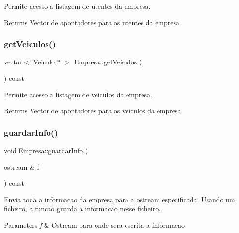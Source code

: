 Permite acesso a listagem de utentes da empresa. 

\begin{DoxyReturn}{Returns}
Vector de apontadores para os utentes da empresa 
\end{DoxyReturn}
\mbox{\label{class_empresa_a64b4f5f7e313a07569451b5a82f822bb}} 
\subsubsection{\texorpdfstring{get\+Veiculos()}{getVeiculos()}}
{\footnotesize\ttfamily vector$<$ \mbox{\hyperlink{class_veiculo}{Veiculo}} $\ast$ $>$ Empresa\+::get\+Veiculos (\begin{DoxyParamCaption}{ }\end{DoxyParamCaption}) const}



Permite acesso a listagem de veiculos da empresa. 

\begin{DoxyReturn}{Returns}
Vector de apontadores para os veiculos da empresa 
\end{DoxyReturn}
\mbox{\label{class_empresa_a4bfb65fa408e944aed798e7c37933b78}} 
\subsubsection{\texorpdfstring{guardar\+Info()}{guardarInfo()}}
{\footnotesize\ttfamily void Empresa\+::guardar\+Info (\begin{DoxyParamCaption}\item[{ostream \&}]{f }\end{DoxyParamCaption}) const}



Envia toda a informacao da empresa para a ostream especificada. Usando um ficheiro, a funcao guarda a informacao nesse ficheiro. 


\begin{DoxyParams}{Parameters}
{\em f} & Ostream para onde sera escrita a informacao \\
\hline
\end{DoxyParams}
\mbox{\label{class_empresa_a216c65bc97b0f205537f914c3171584c}} 
